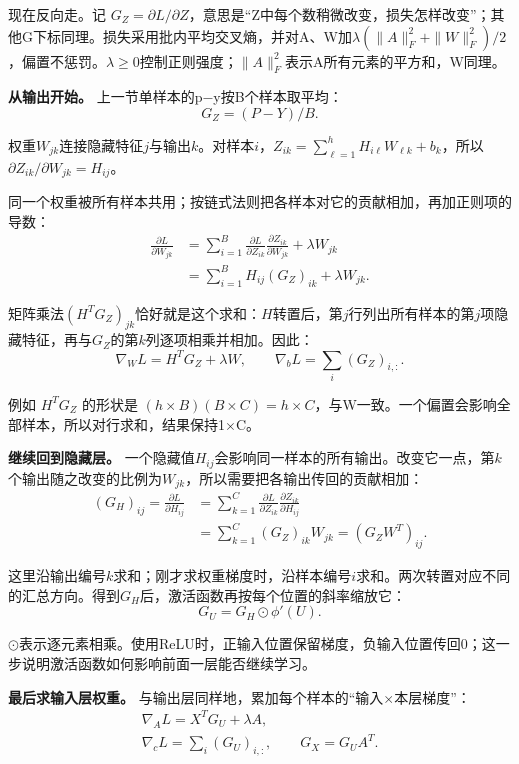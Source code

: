 现在反向走。记 \(G_Z=\partial L/\partial Z\)，意思是“Z中每个数稍微改变，损失怎样改变”；其他G下标同理。损失采用批内平均交叉熵，并对A、W加\(\lambda(\|A\|_F^2+\|W\|_F^2)/2\)，偏置不惩罚。\(\lambda\ge0\)控制正则强度；\(\|A\|_F^2\)表示A所有元素的平方和，W同理。


\textbf{从输出开始。} 上一节单样本的p\ensuremath{-}y按B个样本取平均：
\[
G_Z=(P-Y)/B.\tag{5.8}
\]


权重\(W_{jk}\)连接隐藏特征\(j\)与输出\(k\)。对样本\(i\)，\(Z_{ik}=\sum_{\ell=1}^{h}H_{i\ell}W_{\ell k}+b_k\)，所以\(\partial Z_{ik}/\partial W_{jk}=H_{ij}\)。


同一个权重被所有样本共用；按链式法则把各样本对它的贡献相加，再加正则项的导数：
\[
\begin{aligned}
\frac{\partial L}{\partial W_{jk}}
&=\sum_{i=1}^{B}\frac{\partial L}{\partial Z_{ik}}
 \frac{\partial Z_{ik}}{\partial W_{jk}}+\lambda W_{jk}\\
&=\sum_{i=1}^{B}H_{ij}(G_Z)_{ik}+\lambda W_{jk}.
\end{aligned}\tag{5.8a}
\]


矩阵乘法\((H^TG_Z)_{jk}\)恰好就是这个求和：\(H\)转置后，第\(j\)行列出所有样本的第\(j\)项隐藏特征，再与\(G_Z\)的第\(k\)列逐项相乘并相加。因此：
\[
\nabla_W L=H^TG_Z+\lambda W,\qquad
\nabla_b L=\sum_i(G_Z)_{i,:}.\tag{5.9}
\]


例如 \(H^TG_Z\) 的形状是 \((h\times B)(B\times C)=h\times C\)，与W一致。一个偏置会影响全部样本，所以对行求和，结果保持1\ensuremath{\times}C。


\textbf{继续回到隐藏层。} 一个隐藏值\(H_{ij}\)会影响同一样本的所有输出。改变它一点，第\(k\)个输出随之改变的比例为\(W_{jk}\)，所以需要把各输出传回的贡献相加：
\[
\begin{aligned}
(G_H)_{ij}=\frac{\partial L}{\partial H_{ij}}
&=\sum_{k=1}^{C}\frac{\partial L}{\partial Z_{ik}}
 \frac{\partial Z_{ik}}{\partial H_{ij}}\\
&=\sum_{k=1}^{C}(G_Z)_{ik}W_{jk}
 =(G_ZW^T)_{ij}.
\end{aligned}\tag{5.9a}
\]


这里沿输出编号\(k\)求和；刚才求权重梯度时，沿样本编号\(i\)求和。两次转置对应不同的汇总方向。得到\(G_H\)后，激活函数再按每个位置的斜率缩放它：
\[
G_U=G_H\odot\phi'(U).\tag{5.10}
\]


\(\odot\)表示逐元素相乘。使用ReLU时，正输入位置保留梯度，负输入位置传回0；这一步说明激活函数如何影响前面一层能否继续学习。


\textbf{最后求输入层权重。} 与输出层同样地，累加每个样本的“输入\ensuremath{\times}本层梯度”：
\[
\begin{gathered}\nabla_A L=X^TG_U+\lambda A,\\
\nabla_c L=\sum_i(G_U)_{i,:},\qquad G_X=G_UA^T.\end{gathered}\tag{5.11}
\]


